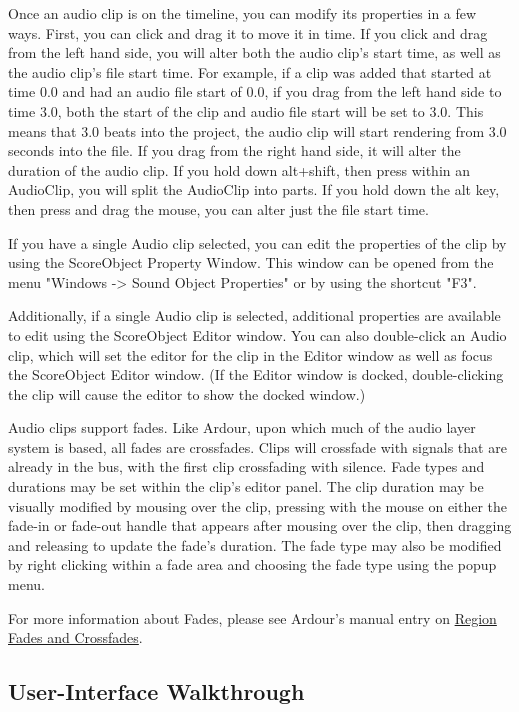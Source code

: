Once an audio clip is on the timeline, you can modify its properties in
a few ways. First, you can click and drag it to move it in time. If you
click and drag from the left hand side, you will alter both the audio
clip's start time, as well as the audio clip's file start time. For
example, if a clip was added that started at time 0.0 and had an audio
file start of 0.0, if you drag from the left hand side to time 3.0, both
the start of the clip and audio file start will be set to 3.0. This
means that 3.0 beats into the project, the audio clip will start
rendering from 3.0 seconds into the file. If you drag from the right
hand side, it will alter the duration of the audio clip. If you hold
down alt+shift, then press within an AudioClip, you will split the
AudioClip into parts. If you hold down the alt key, then press and drag
the mouse, you can alter just the file start time.

If you have a single Audio clip selected, you can edit the properties of
the clip by using the ScoreObject Property Window. This window can be
opened from the menu "Windows -\textgreater{} Sound Object Properties"
or by using the shortcut "F3".

Additionally, if a single Audio clip is selected, additional properties
are available to edit using the ScoreObject Editor window. You can also
double-click an Audio clip, which will set the editor for the clip in
the Editor window as well as focus the ScoreObject Editor window. (If
the Editor window is docked, double-clicking the clip will cause the
editor to show the docked window.)

Audio clips support fades. Like Ardour, upon which much of the audio
layer system is based, all fades are crossfades. Clips will crossfade
with signals that are already in the bus, with the first clip
crossfading with silence. Fade types and durations may be set within the
clip's editor panel. The clip duration may be visually modified by
mousing over the clip, pressing with the mouse on either the fade-in or
fade-out handle that appears after mousing over the clip, then dragging
and releasing to update the fade's duration. The fade type may also be
modified by right clicking within a fade area and choosing the fade type
using the popup menu.

For more information about Fades, please see Ardour's manual entry on
\href{http://manual.ardour.org/editing-and-arranging/create-region-fades-and-crossfades/}{Region
Fades and Crossfades}.

\subsection{User-Interface Walkthrough}

